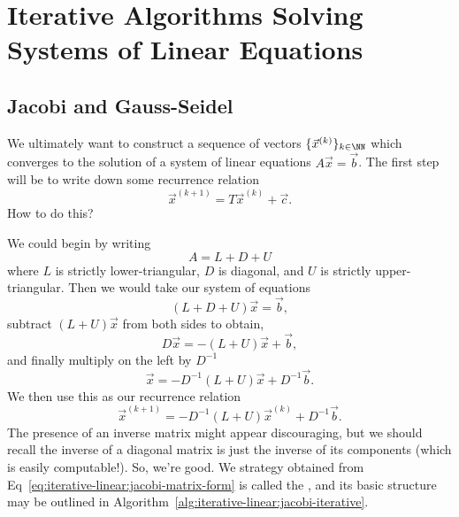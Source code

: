 \chapter{Iterative Algorithms Solving Systems of Linear Equations}

\section{Jacobi and Gauss-Seidel}

We ultimately want to construct a sequence of vectors
$\{\vec{x}^{(k)}\}_{k\in\NN}$ which converges to the solution of a
system of linear equations $A\vec{x}=\vec{b}$. The first step will be to
write down some recurrence relation
\begin{equation}
\vec{x}^{(k+1)}=T\vec{x}^{(k)}+\vec{c}.
\end{equation}
How to do this?

We could begin by writing
\begin{equation}
A = L + D + U
\end{equation}
where $L$ is strictly lower-triangular, $D$ is diagonal, and $U$ is
strictly upper-triangular. Then we would take our system of equations
\begin{equation}
(L+D+U)\vec{x}=\vec{b},
\end{equation}
subtract $(L+U)\vec{x}$ from both sides to obtain,
\begin{equation}
D\vec{x}=-(L+U)\vec{x}+\vec{b},
\end{equation}
and finally multiply on the left by $D^{-1}$
\begin{equation}
\vec{x}=-D^{-1}(L+U)\vec{x}+D^{-1}\vec{b}.
\end{equation}
We then use this as our recurrence relation
\begin{equation}\label{eq:iterative-linear:jacobi-matrix-form}
\vec{x}^{(k+1)}=-D^{-1}(L+U)\vec{x}^{(k)}+D^{-1}\vec{b}.
\end{equation}
The presence of an inverse matrix might appear discouraging, but we
should recall the inverse of a diagonal matrix is just the inverse of
its components (which is easily computable!). So, we're good. We
strategy obtained from Eq~\eqref{eq:iterative-linear:jacobi-matrix-form}
is called the , and its basic structure may be
outlined in Algorithm~\ref{alg:iterative-linear:jacobi-iterative}.

